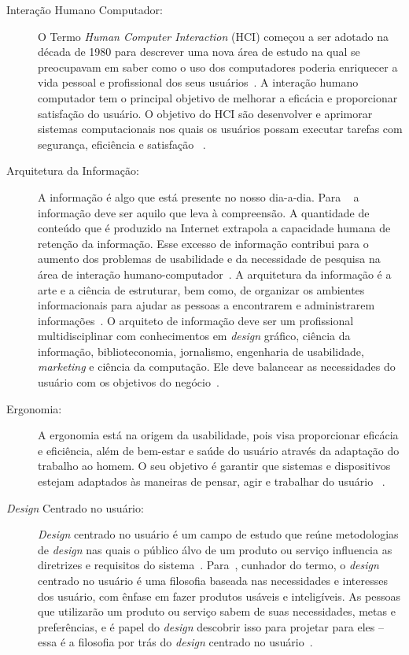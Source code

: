 \begin{description}

\item[Interação Humano Computador:]
%
O Termo \emph{Human Computer Interaction} (HCI) começou a ser adotado na década de 1980 para descrever uma nova área de estudo na qual se preocupavam em saber como o uso dos computadores poderia enriquecer a vida pessoal e profissional dos seus usuários~\cite{moraes2002}.
%
A interação humano computador tem o principal objetivo de melhorar a eficácia e proporcionar satisfação do usuário. O objetivo do HCI são desenvolver e aprimorar sistemas computacionais nos quais os usuários possam executar tarefas com segurança, eficiência e satisfação ~\cite{preece2007}.
	
\item[Arquitetura da Informação:]
%
A informação é algo que está presente no nosso dia-a-dia. Para ~ a informação deve ser aquilo que leva à compreensão. A quantidade de conteúdo que é produzido na Internet extrapola a capacidade humana de retenção da informação. Esse excesso de informação contribui para o aumento dos problemas de usabilidade e da necessidade de pesquisa na área de interação humano-computador~\cite{agner2004}.
%
A arquitetura da informação é a arte e a ciência de estruturar, bem como, de organizar os ambientes informacionais para ajudar as pessoas a encontrarem e administrarem informações~\cite{garret2003}.
%
O arquiteto de informação deve ser um profissional multidisciplinar com conhecimentos em \emph{design} gráfico, ciência da informação, biblioteconomia, jornalismo, engenharia de usabilidade, \emph{marketing} e ciência da computação. Ele deve balancear as necessidades do usuário com os objetivos do negócio~\cite{rosenfeld1998}.

\item[Ergonomia:]
%
A ergonomia está na origem da usabilidade, pois visa proporcionar eficácia e eficiência, além de bem-estar e saúde do usuário através da adaptação do trabalho ao homem.
%
O seu objetivo é garantir que sistemas e dispositivos estejam adaptados às maneiras de pensar, agir e trabalhar do usuário~\cite{cybis2010} .

\item[\emph{Design} Centrado no usuário:]
%
\emph{Design} centrado no usuário é um campo de estudo que reúne metodologias de \emph{design} nas quais o público álvo de um produto ou serviço influencia as diretrizes e requisitos do sistema~\cite{norman2006design}.
%
Para~, cunhador do termo, o \emph{design} centrado no usuário é uma filosofia baseada nas necessidades e interesses dos usuário, com ênfase em fazer produtos usáveis e inteligíveis. 
%
As pessoas que utilizarão um produto ou serviço sabem de suas necessidades, metas e preferências, e é papel do \emph{design} descobrir isso para projetar para eles -- essa é a filosofia por trás do \emph{design} centrado no usuário~\cite{saffer2010designing}.


\end{description}
